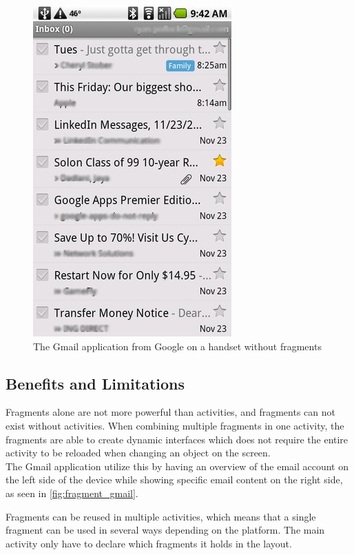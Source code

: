 \begin{figure}[H]
	\centering
		\includegraphics[scale=0.4]{Images/Implementation/fragment_gmail_handset.png}
	\caption{The Gmail application from Google on a handset without fragments}
	\label{fig:fragment_gmail_handset}
\end{figure}

\subsection{Benefits and Limitations}
Fragments alone are not more powerful than activities, and fragments can not exist without activities.
When combining multiple fragments in one activity, the fragments are able to create dynamic interfaces which does not require the entire activity to be reloaded when changing an object on the screen.\\

The Gmail application utilize this by having an overview of the email account on the left side of the device while showing specific email content on the right side, as seen in \autoref{fig:fragment_gmail}.

Fragments can be reused in multiple activities, which means that a single fragment can be used in several ways depending on the platform.
The main activity only have to declare which fragments it holds in the layout.

